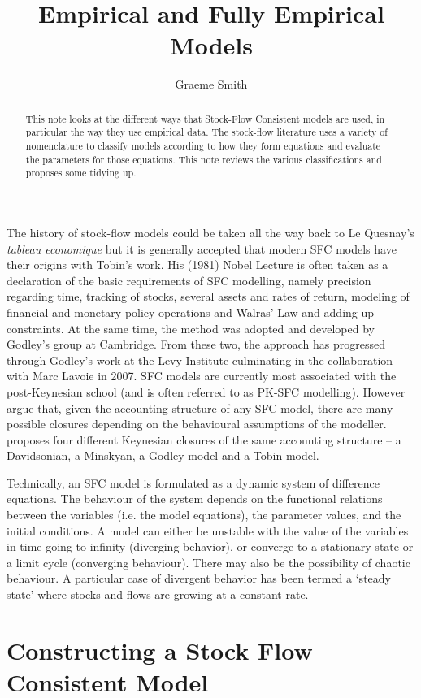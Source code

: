 \documentclass[twoside,a4paper,11pt]{article}
\title{Empirical and Fully Empirical Models}
\author{Graeme Smith}
\begin{document}
\maketitle
\begin{abstract} This note looks at the different ways that Stock-Flow Consistent models are used, in particular the way they use empirical data. The stock-flow literature uses a variety of nomenclature to classify models according to how they form equations and evaluate the parameters  for those equations. This note reviews the various classifications and proposes some tidying up.
\end{abstract}

The history of stock-flow models could be taken all the way back to Le Quesnay's \emph{tableau economique} but it is generally accepted that modern SFC models have their origins with Tobin's work. His (1981) Nobel Lecture is often taken as a declaration of the basic requirements of SFC modelling, namely precision regarding time, tracking of stocks, several assets and rates of return, modeling of financial and monetary policy operations and Walras' Law and adding-up constraints. At the same time, the method was adopted and developed by Godley's group at Cambridge. From these two, the approach has progressed through Godley's work at the Levy Institute culminating in the collaboration with Marc Lavoie in 2007. SFC models are currently most associated with the post-Keynesian school (and is often referred to as PK-SFC modelling). However \cite{Alvarez2014} argue that, given the accounting structure of any SFC model, there are many possible closures depending on the behavioural assumptions of the modeller. \cite{DosSantos2005} proposes four different Keynesian closures of the same accounting structure -- a Davidsonian, a Minskyan, a Godley model and a Tobin model.

Technically, an SFC model is formulated as a dynamic system of difference equations. The behaviour of the system depends on the functional relations between the variables (i.e. the model equations), the parameter values, and the initial conditions. A model can either be unstable with the value of the variables in time going to infinity (diverging behavior), or converge to a stationary state or a limit cycle (converging behaviour). There may also be the possibility of chaotic behaviour. A particular case of divergent behavior has been termed a `steady state' \cite[:p9]{Caverzasi2014a} where stocks and flows are growing at a constant rate.

\section{Constructing a Stock Flow Consistent Model}
\end{document}
